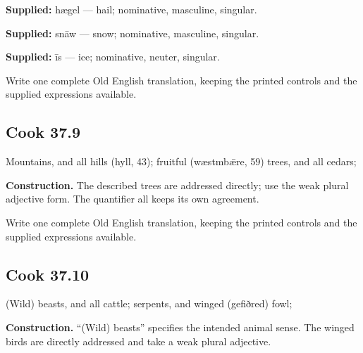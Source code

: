 \textbf{Supplied:} hægel — hail; nominative, masculine, singular.

\textbf{Supplied:} snāw — snow; nominative, masculine, singular.

\textbf{Supplied:} īs — ice; nominative, neuter, singular.

Write one complete Old English translation, keeping the printed controls and the supplied expressions available.

\par\begin{minipage}{\linewidth}\raggedright
\subsection*{Cook 37.9}

Mountains, and all hills (hyll, 43); fruitful (wæstmbǣre, 59) trees, and all cedars;

\textbf{Construction.} The described trees are addressed directly; use the weak plural adjective form. The quantifier all keeps its own agreement.

Write one complete Old English translation, keeping the printed controls and the supplied expressions available.

\end{minipage}\par\addvspace{4pt}

\par\begin{minipage}{\linewidth}\raggedright
\subsection*{Cook 37.10}

(Wild) beasts, and all cattle; serpents, and winged (gefiðred) fowl;

\textbf{Construction.} “(Wild) beasts” specifies the intended animal sense. The winged birds are directly addressed and take a weak plural adjective.

\end{minipage}\par\addvspace{4pt}

